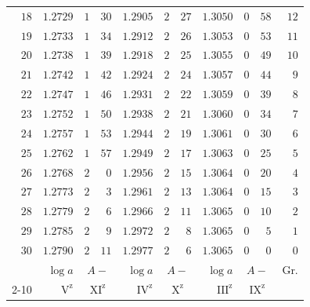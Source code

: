 \begin{center}
\begin{tabular}{r||r|rr||r|rr||r|rr||r}
$18$&$1.2729$&$1$&$30$&$1.2905$&$2$&$27$&$1.3050$&$0$&$58$&$12$\\
$19$&$1.2733$&$1$&$34$&$1.2912$&$2$&$26$&$1.3053$&$0$&$53$&$11$\\
$20$&$1.2738$&$1$&$39$&$1.2918$&$2$&$25$&$1.3055$&$0$&$49$&$10$\\
$21$&$1.2742$&$1$&$42$&$1.2924$&$2$&$24$&$1.3057$&$0$&$44$&$9$\\
$22$&$1.2747$&$1$&$46$&$1.2931$&$2$&$22$&$1.3059$&$0$&$39$&$8$\\
$23$&$1.2752$&$1$&$50$&$1.2938$&$2$&$21$&$1.3060$&$0$&$34$&$7$\\
$24$&$1.2757$&$1$&$53$&$1.2944$&$2$&$19$&$1.3061$&$0$&$30$&$6$\\
$25$&$1.2762$&$1$&$57$&$1.2949$&$2$&$17$&$1.3063$&$0$&$25$&$5$\\
$26$&$1.2768$&$2$&$0$&$1.2956$&$2$&$15$&$1.3064$&$0$&$20$&$4$\\
$27$&$1.2773$&$2$&$3$&$1.2961$&$2$&$13$&$1.3064$&$0$&$15$&$3$\\
$28$&$1.2779$&$2$&$6$&$1.2966$&$2$&$11$&$1.3065$&$0$&$10$&$2$\\
$29$&$1.2785$&$2$&$9$&$1.2972$&$2$&$8$&$1.3065$&$0$&$5$&$1$\\
$30$&$1.2790$&$2$&$11$&$1.2977$&$2$&$6$&$1.3065$&$0$&$0$&$0$\\
\hline
&$\log a$&\multicolumn{2}{c||}{$A-$}&$\log a$&\multicolumn{2}{c||}{$A-$}&$\log a$&\multicolumn{2}{c||}{$A-$}&Gr.\\\cline{2-10}
&$\mathrm V^{\mathrm z}$&\multicolumn{2}{c||}{$\mathrm{XI}^{\mathrm z}$}&$\mathrm{IV}^{\mathrm z}$&\multicolumn{2}{c||}{$\mathrm X^{\mathrm z}$}&$\mathrm{III}^{\mathrm z}$&\multicolumn{2}{c||}{$\mathrm{IX}^{\mathrm z}$}&
\end{tabular}
\endgroup
\end{center}
\clearpage{}
